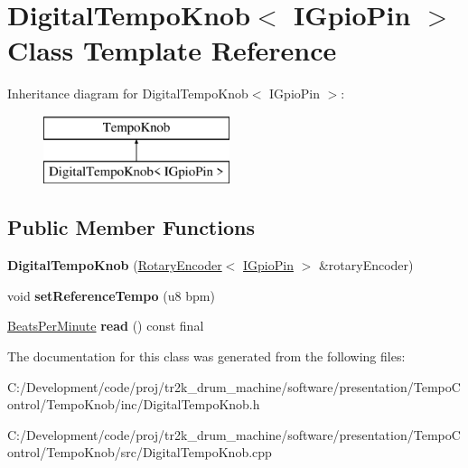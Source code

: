 \hypertarget{class_digital_tempo_knob}{}\section{Digital\+Tempo\+Knob$<$ I\+Gpio\+Pin $>$ Class Template Reference}
\label{class_digital_tempo_knob}
Inheritance diagram for Digital\+Tempo\+Knob$<$ I\+Gpio\+Pin $>$\+:\begin{figure}[H]
\begin{center}
\leavevmode
\includegraphics[height=2.000000cm]{class_digital_tempo_knob}
\end{center}
\end{figure}
\subsection*{Public Member Functions}
\begin{DoxyCompactItemize}
\item 
\mbox{\label{class_digital_tempo_knob_a7a0c8f6a062484a035b37148beb591db}} 
{\bfseries Digital\+Tempo\+Knob} (\mbox{\hyperlink{class_rotary_encoder}{Rotary\+Encoder}}$<$ \mbox{\hyperlink{class_i_gpio_pin}{I\+Gpio\+Pin}} $>$ \&rotary\+Encoder)
\item 
\mbox{\label{class_digital_tempo_knob_a3de50e157858cf898fd6c302575d06f7}} 
void {\bfseries set\+Reference\+Tempo} (u8 bpm)
\item 
\mbox{\label{class_digital_tempo_knob_a3ab91bdef9c4f23e5b30e2dbb80500b3}} 
\mbox{\hyperlink{class_beats_per_minute}{Beats\+Per\+Minute}} {\bfseries read} () const final
\end{DoxyCompactItemize}


The documentation for this class was generated from the following files\+:\begin{DoxyCompactItemize}
\item 
C\+:/\+Development/code/proj/tr2k\+\_\+drum\+\_\+machine/software/presentation/\+Tempo\+Control/\+Tempo\+Knob/inc/Digital\+Tempo\+Knob.\+h\item 
C\+:/\+Development/code/proj/tr2k\+\_\+drum\+\_\+machine/software/presentation/\+Tempo\+Control/\+Tempo\+Knob/src/Digital\+Tempo\+Knob.\+cpp\end{DoxyCompactItemize}
